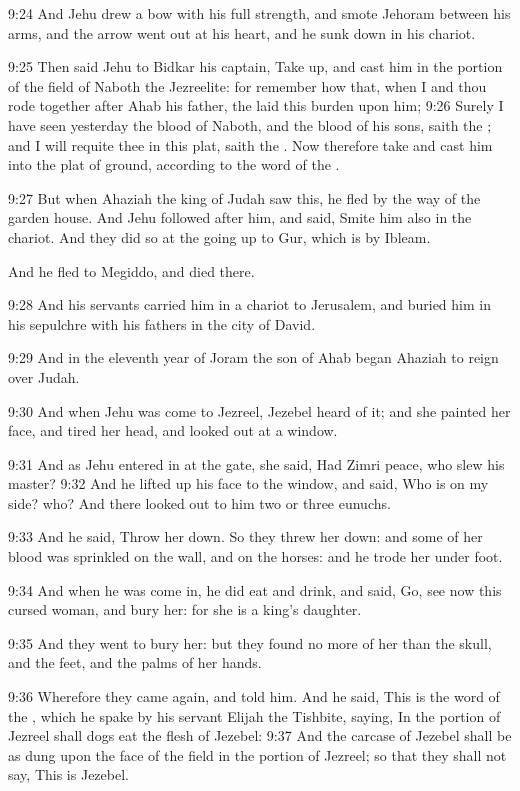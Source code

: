 9:24 And Jehu drew a bow with his full strength, and smote Jehoram
between his arms, and the arrow went out at his heart, and he sunk
down in his chariot.

9:25 Then said Jehu to Bidkar his captain, Take up, and cast him in
the portion of the field of Naboth the Jezreelite: for remember how
that, when I and thou rode together after Ahab his father, the \LORD
laid this burden upon him; 9:26 Surely I have seen yesterday the blood
of Naboth, and the blood of his sons, saith the \LORD; and I will
requite thee in this plat, saith the \LORD. Now therefore take and cast
him into the plat of ground, according to the word of the \LORD.

9:27 But when Ahaziah the king of Judah saw this, he fled by the way
of the garden house. And Jehu followed after him, and said, Smite him
also in the chariot. And they did so at the going up to Gur, which is
by Ibleam.

And he fled to Megiddo, and died there.

9:28 And his servants carried him in a chariot to Jerusalem, and
buried him in his sepulchre with his fathers in the city of David.

9:29 And in the eleventh year of Joram the son of Ahab began Ahaziah
to reign over Judah.

9:30 And when Jehu was come to Jezreel, Jezebel heard of it; and she
painted her face, and tired her head, and looked out at a window.

9:31 And as Jehu entered in at the gate, she said, Had Zimri peace,
who slew his master?  9:32 And he lifted up his face to the window,
and said, Who is on my side?  who? And there looked out to him two or
three eunuchs.

9:33 And he said, Throw her down. So they threw her down: and some of
her blood was sprinkled on the wall, and on the horses: and he trode
her under foot.

9:34 And when he was come in, he did eat and drink, and said, Go, see
now this cursed woman, and bury her: for she is a king's daughter.

9:35 And they went to bury her: but they found no more of her than the
skull, and the feet, and the palms of her hands.

9:36 Wherefore they came again, and told him. And he said, This is the
word of the \LORD, which he spake by his servant Elijah the Tishbite,
saying, In the portion of Jezreel shall dogs eat the flesh of Jezebel:
9:37 And the carcase of Jezebel shall be as dung upon the face of the
field in the portion of Jezreel; so that they shall not say, This is
Jezebel.

